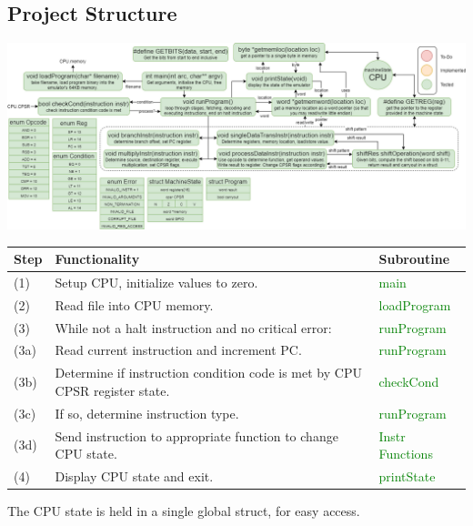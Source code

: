 \documentclass[11pt]{article}
\begin{document}
    \subsection*{Project Structure}
        \begin{center}
            \includegraphics[width = \textwidth]{project status}
        \end{center}
    \begin{center}
        \begin{tabular}{l l l}
            Step & Functionality & Subroutine \\
            \hline
            (1) & Setup CPU, initialize values to zero. & \textcolor{green}{main} \\
            (2) & Read file into CPU memory. & \textcolor{green}{loadProgram}\\
            (3) & While not a halt instruction and no critical error: & \textcolor{green}{runProgram} \\
            (3a) & Read current instruction and increment PC.  & \textcolor{green}{runProgram}\\
            (3b) & Determine if instruction condition code is met by CPU CPSR register state. & \textcolor{green}{checkCond}\\
            (3c) & If so, determine instruction type.  & \textcolor{green}{runProgram}\\
            (3d) & Send instruction to appropriate function to change CPU state. & \textcolor{green}{Instr Functions}\\
            (4) & Display CPU state and exit. & \textcolor{green}{printState} \\
        \end{tabular}
    \end{center}
    The CPU state is held in a single global struct, for easy access. 


    
\end{document}
